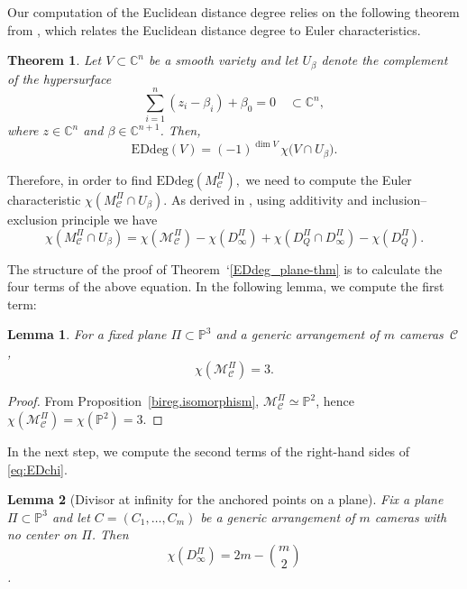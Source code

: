 \documentclass{article}
\newtheorem{theorem}{Theorem}
\newtheorem{lemma}{Lemma}
\newcommand{\PP}{\mathbb{P}}
\begin{document}
Our computation of the Euclidean distance degree relies on the following theorem from \cite{Maxim2020}, which relates the Euclidean distance degree to Euler characteristics.

\begin{theorem} \label{theorem:maxim}
Let $V \subset \mathbb{C}^n$ be a smooth variety and let 
$U_\beta$ denote the complement of the hypersurface 
\[
\sum_{i=1}^n (z_i - \beta_i) + \beta_0 = 0
\quad \subset \mathbb{C}^n,
\]
where $z \in \mathbb{C}^n$ and $\beta \in \mathbb{C}^{n+1}$. Then,
\[
\mathrm{EDdeg}(V) = (-1)^{\dim V}\,\chi\bigl(V \cap U_\beta\bigr).
\]
\end{theorem}

Therefore, in order to find 
$ \mathrm{EDdeg} (M^\Pi_{\mathcal{C}}),$ 
we need to compute the Euler characteristic 
$ \chi\!\left(M^\Pi_{\mathcal{C}} \cap U_\beta\right).$ As derived in \cite{Maxim2020}, using additivity and inclusion--exclusion principle we have
\[\label{eq:EDchi}
\chi(M^\Pi_{\mathcal{C}} \cap U_\beta) 
= \chi(\mathcal{M}^\Pi_{\mathcal{C}}) - \chi(D_\infty^\Pi) + \chi(D_Q^\Pi \cap D_\infty^\Pi) - \chi(D_Q^\Pi).\tag{1}
\]

The structure of the proof of Theorem~`\ref{EDdeg_plane-thm} is to calculate the four terms of the above equation. In the following lemma, we compute the first term:
\begin{lemma}\label{eu: plane-anchor MV}
 For a fixed plane $\Pi \subset \mathbb{P}^3$ and a generic arrangement of $m$ cameras~$\mathcal{C}$,
\[
\chi\!\left(\mathcal{M}^{\Pi}_{\mathcal{C}}\right) = 3.
\]
\end{lemma} 


\begin{proof}
From Proposition~\ref{bireg.isomorphism}, $\mathcal{M}^{\Pi}_{\mathcal{C}} \simeq \mathbb{P}^2$, hence $\chi(\mathcal{M}^{\Pi}_{\mathcal{C}})=\chi(\mathbb{P}^2)=3$. 
\end{proof}
In the next step, we compute the second terms of the right-hand sides of \eqref{eq:EDchi}.
\begin{lemma}[Divisor at infinity for the anchored points on a plane]
\label{lem:Dinfty-plane}
Fix a plane~$\Pi\subset \PP^{3}$ and let $C=(C_{1},\dots,C_{m})$ be a generic arrangement of $m$ cameras with no center on $\Pi$. Then
$$\chi\!\left(D_{\infty}^{\Pi}\right)=2m-\binom{m}{2}$$.
\end{lemma}
\end{document}

